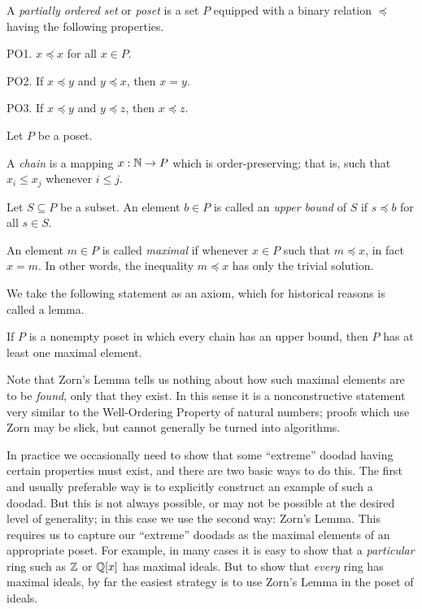 \begin{dfn}[Poset]
A \emph{partially ordered set} or \emph{poset} is a set \(P\) equipped with a binary relation \(\preceq\) having the following properties.
\begin{proplist}
\item[PO1.] \(x \preceq x\) for all \(x \in P\).
\item[PO2.] If \(x \preceq y\) and \(y \preceq x\), then \(x = y\).
\item[PO3.] If \(x \preceq y\) and \(y \preceq z\), then \(x \preceq z\).
\end{proplist}
\end{dfn}

\begin{dfn}
Let \(P\) be a poset.
\begin{proplist}
\item A \emph{chain} is a mapping \(x : \mathbb{N} \rightarrow P\) which is order-preserving; that is, such that \(x_i \leq x_j\) whenever \(i \leq j\).
\item Let \(S \subseteq P\) be a subset.
An element \(b \in P\) is called an \emph{upper bound} of \(S\) if \(s \preceq b\) for all \(s \in S\).
\item An element \(m \in P\) is called \emph{maximal} if whenever \(x \in P\) such that \(m \preceq x\), in fact \(x = m\).
In other words, the inequality \(m \preceq x\) has only the trivial solution.
\end{proplist}
\end{dfn}

We take the following statement as an axiom, which for historical reasons is called a lemma.

\begin{axiom}
If \(P\) is a nonempty poset in which every chain has an upper bound, then \(P\) has at least one maximal element.
\end{axiom}

Note that Zorn's Lemma tells us nothing about how such maximal elements are to be \emph{found}, only that they exist.
In this sense it is a nonconstructive statement very similar to the Well-Ordering Property of natural numbers; proofs which use Zorn may be slick, but cannot generally be turned into algorithms.

In practice we occasionally need to show that some ``extreme'' doodad having certain properties must exist, and there are two basic ways to do this.
The first and usually preferable way is to explicitly construct an example of such a doodad.
But this is not always possible, or may not be possible at the desired level of generality; in this case we use the second way: Zorn's Lemma.
This requires us to capture our ``extreme'' doodads as the maximal elements of an appropriate poset.
For example, in many cases it is easy to show that a \emph{particular} ring such as \(\mathbb{Z}\) or \(\mathbb{Q}[x]\) has maximal ideals.
But to show that \emph{every} ring has maximal ideals, by far the easiest strategy is to use Zorn's Lemma in the poset of ideals.

